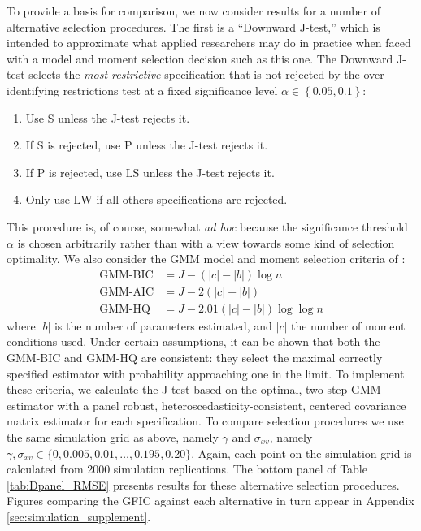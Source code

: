 To provide a basis for comparison, we now consider results for a number of alternative selection procedures. 
The first is a ``Downward J-test,'' which is intended to approximate what applied researchers may do in practice when faced with a model and moment selection decision such as this one.
The Downward J-test selects the \emph{most restrictive} specification that is not rejected by the over-identifying restrictions test at a fixed significance level $\alpha \in \left\{ 0.05, 0.1 \right\}$:
\begin{enumerate}
\item Use $\text{S}$ unless the J-test rejects it. 
\item If $\text{S}$ is rejected, use $\text{P}$ unless the J-test rejects it. 
\item If $\text{P}$ is rejected, use $\text{LS}$ unless the J-test rejects it. 
\item Only use $\text{LW}$ if all others specifications are rejected.
\end{enumerate}
This procedure is, of course, somewhat \emph{ad hoc} because the significance threshold $\alpha$ is chosen arbitrarily rather than with a view towards some kind of selection optimality. 
We also consider the GMM model and moment selection criteria of \cite{AndrewsLu}: 
	\begin{align*}
	 \mbox{GMM-BIC} &= J - (|c| - |b|) \log{n}\\
	 \mbox{GMM-AIC}&= J - 2(|c| - |b|)\\ 
	 \mbox{GMM-HQ} &= J - 2.01 (|c| - |b|)  \log{\log{n}}
	\end{align*}
where $|b|$ is the number of parameters estimated, and $|c|$ the number of moment conditions used. 
Under certain assumptions, it can be shown that both the GMM-BIC and GMM-HQ are consistent: they select the maximal correctly specified estimator with probability approaching one in the limit. 
To implement these criteria, we calculate the J-test based on the optimal, two-step GMM estimator with a panel robust, heteroscedasticity-consistent, centered covariance matrix estimator for each specification.
To compare selection procedures we use the same simulation grid as above, namely $\gamma$ and $\sigma_{xv}$, namely $\gamma, \sigma_{xv} \in \{0, 0.005, 0.01, \hdots, 0.195, 0.20\}$.  
Again, each point on the simulation grid is calculated from 2000 simulation replications. 
The bottom panel of Table \ref{tab:Dpanel_RMSE} presents results for these alternative selection procedures.
Figures comparing the GFIC against each alternative in turn appear in Appendix \ref{sec:simulation_supplement}.
